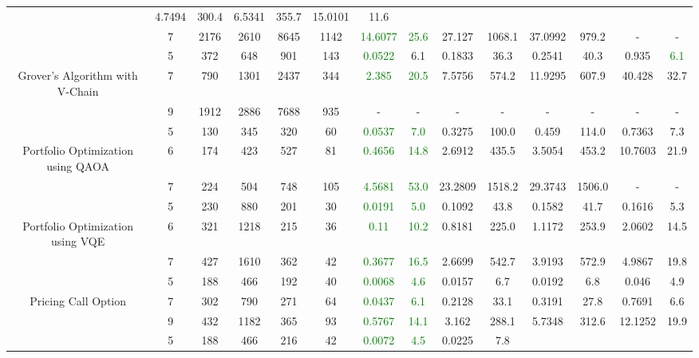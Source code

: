 \begin{table}[htb]
{\begin{tabular}{|c|c|c|c|c|c|c|c|c|c|c|c|c|c|}
 & 4.7494 & 300.4
 & 6.5341 & 355.7
 & 15.0101 & 11.6
 \\
 & 
7 & 2176 & 2610 & 8645 & 1142
 & \textcolor{green}{14.6077} & \textcolor{green}{25.6}
 & 27.127 & 1068.1
 & 37.0992 & 979.2
 & - & -
 \\
\hline
 & 
5 & 372 & 648 & 901 & 143
 & \textcolor{green}{0.0522} & 6.1
 & 0.1833 & 36.3
 & 0.2541 & 40.3
 & 0.935 & \textcolor{green}{6.1}
 \\
Grover's Algorithm with V-Chain & 
7 & 790 & 1301 & 2437 & 344
 & \textcolor{green}{2.385} & \textcolor{green}{20.5}
 & 7.5756 & 574.2
 & 11.9295 & 607.9
 & 40.428 & 32.7
 \\
 & 
9 & 1912 & 2886 & 7688 & 935
 & - & -
 & - & -
 & - & -
 & - & -
 \\
\hline
 & 
5 & 130 & 345 & 320 & 60
 & \textcolor{green}{0.0537} & \textcolor{green}{7.0}
 & 0.3275 & 100.0
 & 0.459 & 114.0
 & 0.7363 & 7.3
 \\
Portfolio Optimization using QAOA & 
6 & 174 & 423 & 527 & 81
 & \textcolor{green}{0.4656} & \textcolor{green}{14.8}
 & 2.6912 & 435.5
 & 3.5054 & 453.2
 & 10.7603 & 21.9
 \\
 & 
7 & 224 & 504 & 748 & 105
 & \textcolor{green}{4.5681} & \textcolor{green}{53.0}
 & 23.2809 & 1518.2
 & 29.3743 & 1506.0
 & - & -
 \\
\hline
 & 
5 & 230 & 880 & 201 & 30
 & \textcolor{green}{0.0191} & \textcolor{green}{5.0}
 & 0.1092 & 43.8
 & 0.1582 & 41.7
 & 0.1616 & 5.3
 \\
Portfolio Optimization using VQE & 
6 & 321 & 1218 & 215 & 36
 & \textcolor{green}{0.11} & \textcolor{green}{10.2}
 & 0.8181 & 225.0
 & 1.1172 & 253.9
 & 2.0602 & 14.5
 \\
 & 
7 & 427 & 1610 & 362 & 42
 & \textcolor{green}{0.3677} & \textcolor{green}{16.5}
 & 2.6699 & 542.7
 & 3.9193 & 572.9
 & 4.9867 & 19.8
 \\
\hline
 & 
5 & 188 & 466 & 192 & 40
 & \textcolor{green}{0.0068} & \textcolor{green}{4.6}
 & 0.0157 & 6.7
 & 0.0192 & 6.8
 & 0.046 & 4.9
 \\
Pricing Call Option & 
7 & 302 & 790 & 271 & 64
 & \textcolor{green}{0.0437} & \textcolor{green}{6.1}
 & 0.2128 & 33.1
 & 0.3191 & 27.8
 & 0.7691 & 6.6
 \\
 & 
9 & 432 & 1182 & 365 & 93
 & \textcolor{green}{0.5767} & \textcolor{green}{14.1}
 & 3.162 & 288.1
 & 5.7348 & 312.6
 & 12.1252 & 19.9
 \\
\hline
 & 
5 & 188 & 466 & 216 & 42
 & \textcolor{green}{0.0072} & \textcolor{green}{4.5}
 & 0.0225 & 7.8

\end{tabular}}
\end{table}
